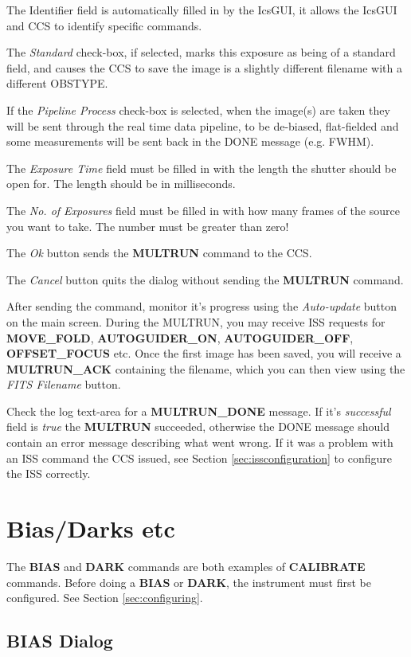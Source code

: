 \documentclass[10pt,a4paper]{article}
\begin{document}
The Identifier field is automatically filled in by the IcsGUI, it allows the IcsGUI and CCS to identify
specific commands.

The {\em Standard} check-box, if selected, marks this exposure as being of a standard field, and causes the CCS
to save the image is a slightly different filename with a different OBSTYPE.

If the {\em Pipeline Process} check-box is selected, when the image(s) are taken they will be sent through the 
real time data pipeline, to be de-biased, flat-fielded and some measurements will be sent back in the DONE message
(e.g. FWHM).

The {\em Exposure Time} field must be filled in with the length the shutter should be open for. The length should
be in milliseconds.

The {\em No. of Exposures} field must be filled in with how many frames of the source you want to take. The number
must be greater than zero!

The {\em Ok} button sends the {\bf MULTRUN} command to the CCS.

The {\em Cancel} button quits the dialog without sending the {\bf MULTRUN} command.

After sending the command, monitor it's progress using the {\em Auto-update} button on the main screen. 
During the MULTRUN, you may receive ISS requests for {\bf MOVE\_FOLD}, {\bf AUTOGUIDER\_ON}, {\bf AUTOGUIDER\_OFF},
{\bf OFFSET\_FOCUS} etc. Once the first image has been saved, you will receive a {\bf MULTRUN\_ACK} containing
the filename, which you can then view using the {\em FITS Filename} button. 

Check the log text-area for a {\bf MULTRUN\_DONE} message. If it's {\em successful} field is {\em true} the 
{\bf MULTRUN} succeeded, otherwise the DONE message should contain an error message describing what went wrong. 
If it was a problem with an ISS command the CCS issued, see Section \ref{sec:issconfiguration} to configure
the ISS correctly.

\section{Bias/Darks etc}

The {\bf BIAS} and {\bf DARK} commands are both examples of {\bf CALIBRATE} commands. 
Before doing a {\bf BIAS} or {\bf DARK}, the instrument must first be configured. See Section \ref{sec:configuring}.

\subsection{BIAS Dialog}
\end{document}
